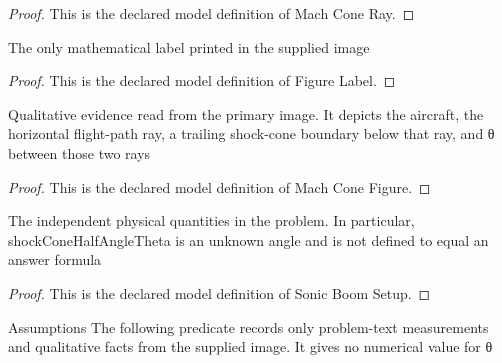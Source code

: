 \begin{proof}
  This is the declared model definition of Mach Cone Ray.
\end{proof}
\begin{definition}
  \label{def:physics:phyx-mini-0220:phyxminiproblems-problemphyxmini0220-figurelabel}
  The only mathematical label printed in the supplied image
\end{definition}
\begin{proof}
  This is the declared model definition of Figure Label.
\end{proof}
\begin{definition}
  \label{def:physics:phyx-mini-0220:phyxminiproblems-problemphyxmini0220-machconefigure}
  Qualitative evidence read from the primary image. It depicts the aircraft, the horizontal flight-path ray, a trailing shock-cone boundary below that ray, and θ between those two rays
\end{definition}
\begin{proof}
  This is the declared model definition of Mach Cone Figure.
\end{proof}
\begin{definition}
  \label{def:physics:phyx-mini-0220:phyxminiproblems-problemphyxmini0220-sonicboomsetup}
  The independent physical quantities in the problem. In particular, shockConeHalfAngleTheta is an unknown angle and is not defined to equal an answer formula
\end{definition}
\begin{proof}
  This is the declared model definition of Sonic Boom Setup.
\end{proof}
\begin{definition}
  \label{def:physics:phyx-mini-0220:phyxminiproblems-problemphyxmini0220-matchesproblemandsuppliedfigure}
  Assumptions The following predicate records only problem-text measurements and qualitative facts from the supplied image. It gives no numerical value for θ
\end{definition}
